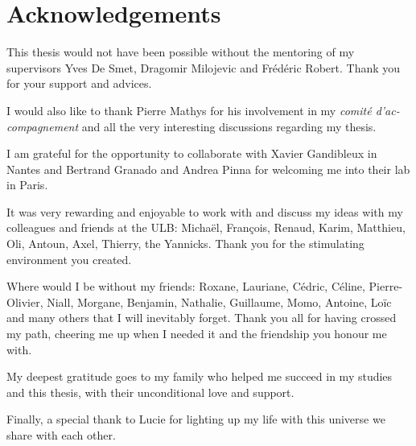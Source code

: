 \chapter{Acknowledgements}

This thesis would not have been possible without the mentoring of my supervisors Yves De Smet, Dragomir Milojevic and Frédéric Robert. Thank you for your support and advices.

I would also like to thank Pierre Mathys for his involvement in my \textit{comité d'ac-compagnement} and all the very interesting discussions regarding my thesis.

I am grateful for the opportunity to collaborate with Xavier Gandibleux in Nantes and Bertrand Granado and Andrea Pinna for welcoming me into their lab in Paris.

It was very rewarding and enjoyable to work with and discuss my ideas with my colleagues and friends at the ULB: Michaël, François, Renaud, Karim, Matthieu, Oli, Antoun, Axel, Thierry, the Yannicks. Thank you for the stimulating environment you created.

Where would I be without my friends: Roxane, Lauriane, Cédric, Céline, Pierre-Olivier, Niall, Morgane, Benjamin, Nathalie, Guillaume, Momo, Antoine, Loïc and many others that I will inevitably forget. Thank you all for having crossed my path, cheering me up when I needed it and the friendship you honour me with.

My deepest gratitude goes to my family who helped me succeed in my studies and this thesis, with their unconditional love and support.

Finally, a special thank to Lucie for lighting up my life with this universe we share with each other.